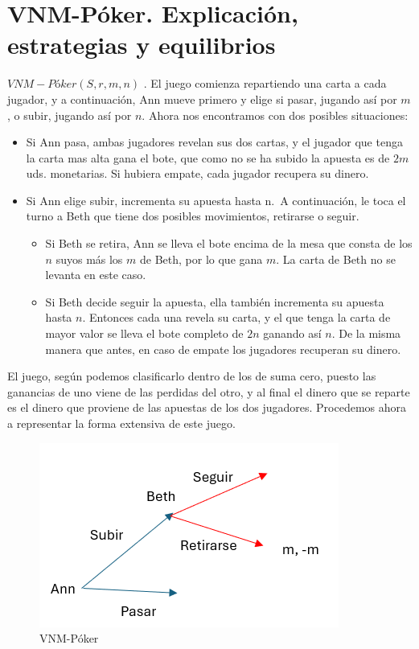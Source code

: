 \documentclass[12pt,a4paper,]{book}
\providecommand{\tightlist}{%
  \setlength{\itemsep}{0pt}\setlength{\parskip}{0pt}}
\numberwithin{dummy}{section}
\theoremstyle{ocrenumbox}
\theoremstyle{blacknumex}
\theoremstyle{blacknumbox}
\theoremstyle{ocrenum}
\theoremstyle{ocrenum}
\begin{document}
\hypertarget{Seccion51}{%
\section{VNM-Póker. Explicación, estrategias y
equilibrios}\label{Seccion51}}

\textbf{\(VNM-Póker(S,r,m,n)\)} . El juego comienza repartiendo una
carta a cada jugador, y a continuación, Ann mueve primero y elige si
pasar, jugando así por \(m\), o subir, jugando así por \(n\). Ahora nos
encontramos con dos posibles situaciones:

\begin{itemize}
\item
  Si Ann pasa, ambas jugadores revelan sus dos cartas, y el jugador que
  tenga la carta mas alta gana el bote, que como no se ha subido la
  apuesta es de \(2m\) uds. monetarias. Si hubiera empate, cada jugador
  recupera su dinero.
\item
  Si Ann elige subir, incrementa su apuesta hasta n.~A continuación, le
  toca el turno a Beth que tiene dos posibles movimientos, retirarse o
  seguir.

  \begin{itemize}
  \tightlist
  \item
    Si Beth se retira, Ann se lleva el bote encima de la mesa que consta
    de los \(n\) suyos más los \(m\) de Beth, por lo que gana \(m\). La
    carta de Beth no se levanta en este caso.
  \item
    Si Beth decide seguir la apuesta, ella también incrementa su apuesta
    hasta \(n\). Entonces cada una revela su carta, y el que tenga la
    carta de mayor valor se lleva el bote completo de \(2n\) ganando así
    \(n\). De la misma manera que antes, en caso de empate los jugadores
    recuperan su dinero.
  \end{itemize}
\end{itemize}

El juego, según \citep{Libro7} podemos clasificarlo dentro de los de
suma cero, puesto las ganancias de uno viene de las perdidas del otro, y
al final el dinero que se reparte es el dinero que proviene de las
apuestas de los dos jugadores. Procedemos ahora a representar la forma
extensiva de este juego.

\begin{figure}[H]

{\centering \includegraphics[width=0.8\linewidth]{extensiva_VNM} 

}

\caption{\label{forma_extensiva_VNM}VNM-Póker}\label{fig:VNM_Khun}
\end{figure}
\end{document}

